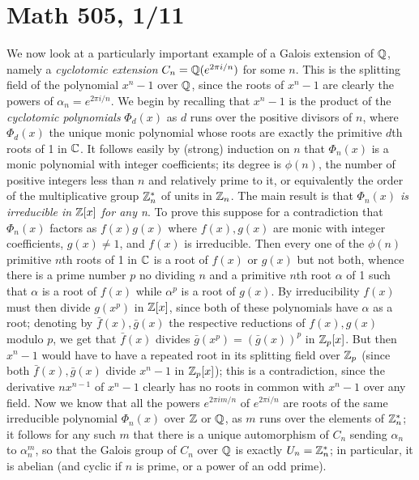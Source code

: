 \documentclass[10pt]{article}
\begin{document}
\section*{Math 505, 1/11}

We now look at a particularly important example of a Galois extension of
$\Bbb Q$, namely a {\sl cyclotomic extension} $C_n = \Bbb Q(e^{2\pi
  i/n})$ for some $n$. This is the splitting field of the polynomial
$x^n - 1$ over $\Bbb Q$, since the roots of $x^n - 1$ are clearly the
powers of $\alpha_n = e^{2\pi i/n}$. We begin by recalling that $x^n -
1$ is the product of the {\sl cyclotomic polynomials} $\Phi_d(x)$ as $d$
runs over the positive divisors of $n$, where $\Phi_d(x)$ the unique
monic polynomial whose roots are exactly the primitive $d$th roots of 1
in $\Bbb C$. It follows easily by (strong) induction on $n$ that
$\Phi_n(x)$ is a monic polynomial with integer coefficients; its degree
is $\phi(n)$, the number of positive integers less than $n$ and
relatively prime to it, or equivalently the order of the multiplicative
group $\Bbb Z_n^*$ of units in $\Bbb Z_n$. The main result is that {\sl
  $\Phi_n(x)$ is irreducible in $\Bbb Z[x]$ for any n}. To prove this
suppose for a contradiction that $\Phi_n(x)$ factors as $f(x) g(x)$
where $f(x),g(x)$ are monic with integer coefficients, $g(x)\ne1$, and
$f(x)$ is irreducible. Then every one of the $\phi(n)$ primitive $n$th
roots of 1 in $\Bbb C$ is a root of $f(x)$ or $g(x)$ but not both,
whence there is a prime number $p$ no dividing $n$ and a primitive $n$th
root $\alpha$ of 1 such that $\alpha$ is a root of $f(x)$ while
$\alpha^p$ is a root of $g(x)$. By irreducibility $f(x)$ must then
divide $g(x^p)$ in $\Bbb Z[x]$, since both of these polynomials have
$\alpha$ as a root; denoting by $\bar f(x),\bar g(x)$ the respective
reductions of $f(x),g(x)$ modulo $p$, we get that $\bar f(x)$ divides
$\bar g(x^p) = (\bar g(x))^p$ in $\Bbb Z_p[x]$. But then $x^n - 1$ would
have to have a repeated root in its splitting field over $\Bbb Z_p$
(since both $\bar f(x),\bar g(x)$ divide $x^n - 1$ in $\Bbb Z_p[x]$);
this is a contradiction, since the derivative $nx^{n-1}$ of $x^n - 1$
clearly has no roots in common with $x^n - 1$ over any field. Now we
know that all the powers $e^{2\pi i m/n}$ of $e^{2\pi i/n}$ are roots of
the same irreducible polynomial $\Phi_n(x)$ over $\Bbb Z$ or $\Bbb Q$,
as $m$ runs over the elements of $\Bbb Z_n^*$; it follows for any such
$m$ that there is a unique automorphism of $C_n$ sending $\alpha_n$ to
$\alpha_n^m$, so that the Galois group of $C_n$ over $\Bbb Q$ is exactly
$U_n = \Bbb Z_n^*$; in particular, it is abelian (and cyclic if $n$ is
prime, or a power of an odd prime).
\end{document}
